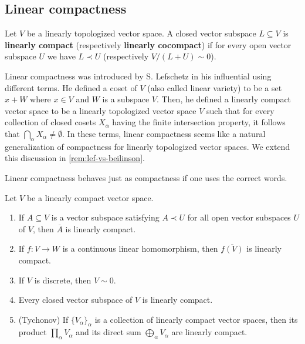 \subsection{Linear compactness}
\begin{definition}\label{def:linear_compactness}
	Let $V$ be a linearly topologized vector space. A closed vector subspace $L \subseteq V$ is \textbf{linearly compact} (respectively \textbf{linearly cocompact}) if for every open vector subspace $U$ we have $L \prec U$ (respectively $V/(L+U) \sim 0$). 
\end{definition}
\begin{remark}\label{rem:lefschetz-linear-compactness}
	Linear compactness was introduced by S. Lefschetz in his influential \cite{Lefschetz-Alg-Top} using different terms. He defined a coset of $V$ (also called linear variety) to be a set $x + W$ where $x\in V$ and $W$ is a subspace $V$. Then, he defined a linearly compact vector space to be a linearly topologized vector space $V$ such that for every collection of closed cosets $X_{\alpha}$ having the finite intersection property, it follows that $\bigcap_{\alpha} X_{\alpha} \neq \emptyset$. In these terms, linear compactness seems like a natural generalization of compactness for linearly topologized vector spaces. We extend this discussion in \cref{rem:lef-vs-beilinson}.
\end{remark}
Linear compactness behaves just as compactness if one uses the correct words.
\begin{theorem}\label{thm:linear_compactness_properties}
	Let $V$ be a linearly compact vector space.
	\begin{enumerate}[label = (\alph*)]
		\item If $A \subseteq V$ is a vector subspace satisfying $A \prec U$ for all open vector subspaces $U$ of $V$, then $\overline{A}$ is linearly compact.
		\item If $f\colon V \to W$ is a continuous linear homomorphism, then $\overline{f(V)}$ is linearly compact.
		\item If $V$ is discrete, then $V \sim 0$.
		\item Every closed vector subspace of $V$ is linearly compact.
		\item (Tychonov) If $\{V_{\alpha}\}_{\alpha}$ is a collection of linearly compact vector spaces, then its product $\prod_{\alpha} V_{\alpha}$ and its direct sum $\bigoplus_{\alpha}V_{\alpha}$ are linearly compact.
	\end{enumerate}
\end{theorem}
